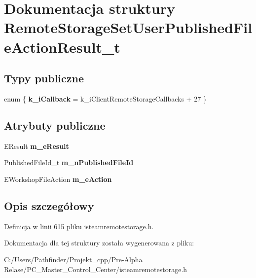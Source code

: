\hypertarget{struct_remote_storage_set_user_published_file_action_result__t}{}\section{Dokumentacja struktury Remote\+Storage\+Set\+User\+Published\+File\+Action\+Result\+\_\+t}
\label{struct_remote_storage_set_user_published_file_action_result__t}
\subsection*{Typy publiczne}
\begin{DoxyCompactItemize}
\item 
\mbox{\label{struct_remote_storage_set_user_published_file_action_result__t_af4ff1ad5dffbf5b73b99a070707675d7}} 
enum \{ {\bfseries k\+\_\+i\+Callback} = k\+\_\+i\+Client\+Remote\+Storage\+Callbacks + 27
 \}
\end{DoxyCompactItemize}
\subsection*{Atrybuty publiczne}
\begin{DoxyCompactItemize}
\item 
\mbox{\label{struct_remote_storage_set_user_published_file_action_result__t_a49e125e3cd057e320313fd3856e2bd50}} 
E\+Result {\bfseries m\+\_\+e\+Result}
\item 
\mbox{\label{struct_remote_storage_set_user_published_file_action_result__t_ace8d1bdbdd47e5fd15933018b6726756}} 
Published\+File\+Id\+\_\+t {\bfseries m\+\_\+n\+Published\+File\+Id}
\item 
\mbox{\label{struct_remote_storage_set_user_published_file_action_result__t_af971177a8c3d6c0fc35e833c628588ee}} 
E\+Workshop\+File\+Action {\bfseries m\+\_\+e\+Action}
\end{DoxyCompactItemize}


\subsection{Opis szczegółowy}


Definicja w linii 615 pliku isteamremotestorage.\+h.



Dokumentacja dla tej struktury została wygenerowana z pliku\+:\begin{DoxyCompactItemize}
\item 
C\+:/\+Users/\+Pathfinder/\+Projekt\+\_\+cpp/\+Pre-\/\+Alpha Relase/\+P\+C\+\_\+\+Master\+\_\+\+Control\+\_\+\+Center/isteamremotestorage.\+h\end{DoxyCompactItemize}
